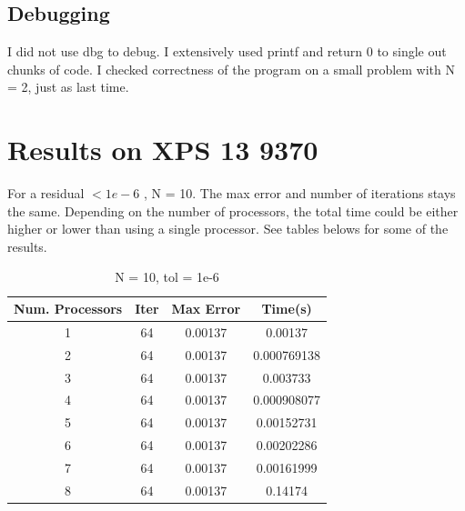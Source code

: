 \documentclass{amsart} %
\begin{document}
\subsection{Debugging}

I did not use dbg to debug. I extensively used printf and return 0 to single out chunks of code. I checked correctness of the program on a small problem with N = 2, just as last time. 

\section{Results on XPS 13 9370}
For a residual $< 1e-6$ , N = 10. The max error and number of iterations stays the same. Depending on the number of processors, the total time could be either higher or lower than using a single processor. See tables belows for some of the results.  
\begin{table}[ht]
	\caption{N = 10, tol = 1e-6} %
	\centering %
	\begin{tabular}{c c c c} %
		\hline\hline %
		Num. Processors & Iter & Max Error & Time(s) \\ [0.5ex] %
		\hline %
		1 & 64 & 0.00137 & 0.00137 \\ %
		2 & 64 & 0.00137 & 0.000769138 \\
		3 & 64 & 0.00137 & 0.003733 \\
		4 & 64 & 0.00137 & 0.000908077 \\
		5 & 64 & 0.00137 & 0.00152731 \\ 
		6 & 64 & 0.00137 & 0.00202286 \\
		7 & 64 & 0.00137 & 0.00161999 \\
		8 & 64 & 0.00137 & 0.14174 \\[1ex] %
		\hline %
	\end{tabular}
	\label{table:nonlin} %
\end{table}
\end{document}
